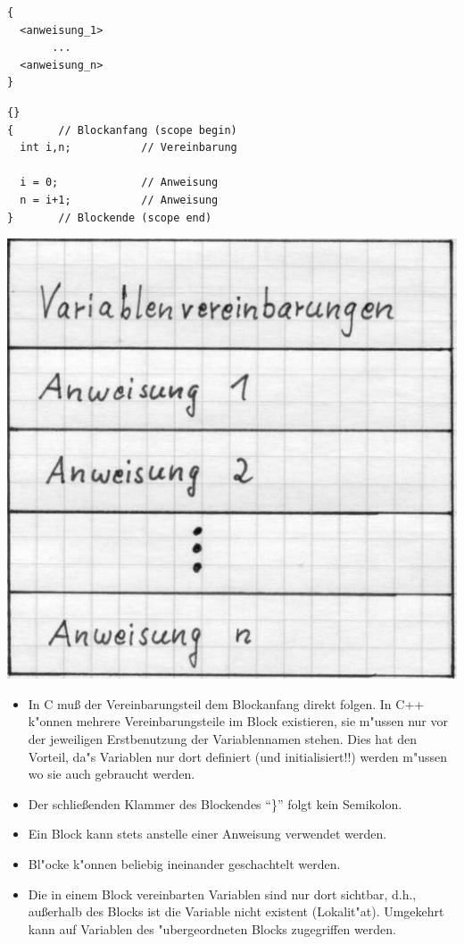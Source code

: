 \mbox{}\hfill
\begin{minipage}{0.5\textwidth}
\begin{verbatim}
{
  <anweisung_1>
       ...
  <anweisung_n>
}
\end{verbatim}
\end{minipage} \vspace{-8ex}
\hfill\mbox{}
%
\begin{minipage}[b]{0.5\textwidth}
\begin{lstlisting}[caption=Blocksequenz,label=lst:4_2_1]{}
{       // Blockanfang (scope begin)
  int i,n;           // Vereinbarung

  i = 0;             // Anweisung
  n = i+1;           // Anweisung
}       // Blockende (scope end)
\end{lstlisting}
\end{minipage}
\hfill \includegraphics[scale=0.15]{GIF/p26}
%
\begin{itemize}
 \item
  In C {mu\ss} der Vereinbarungsteil dem Blockanfang direkt folgen.
  In C++ k"onnen mehrere Vereinbarungsteile im Block existieren, sie
  m"ussen nur vor der jeweiligen Erstbenutzung der Variablennamen stehen.
  Dies hat den Vorteil, da"s Variablen nur dort definiert (und initialisiert!!) werden m"ussen
  wo sie auch gebraucht werden.
 \item Der schlie{\ss}enden Klammer des Blockendes ``\}'' folgt kein
 	Semikolon.
 \item Ein Block kann stets anstelle einer Anweisung verwendet werden.
 \item Bl"ocke k"onnen beliebig ineinander  geschachtelt werden.
 \item Die in einem Block vereinbarten Variablen sind nur dort sichtbar,
 	d.h., au{\ss}erhalb des Blocks ist die Variable nicht existent
	(Lokalit"at). Umgekehrt kann auf Variablen des "ubergeordneten Blocks
	zugegriffen werden.
\end{itemize}
